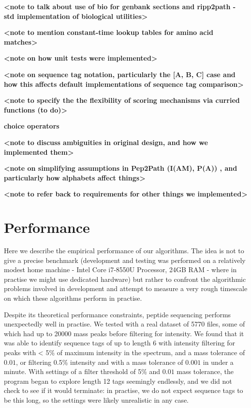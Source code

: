\documentclass{l4proj}
\begin{document}
\textbf{<note to talk about use of bio for genbank sections and ripp2path - std implementation of biological utilities>}

\textbf{<note to mention constant-time lookup tables for amino acid matches>}

\textbf{<note on how unit tests were implemented>}

\textbf{<note on sequence tag notation, particularly the [A, B, C] case and how this affects default implementations of sequence tag comparison>}

\textbf{<note to specify the the flexibility of scoring mechanisms via curried functions (to do)>}

\textbf{choice operators}

\textbf{<note to discuss ambiguities in original design, and how we implemented them>}

\textbf{<note on simplifying assumptions in Pep2Path (I(AM), P(A)) , and particularly how alphabets affect things>}

\textbf{<note to refer back to requirements for other things we implemented>}

\section{Performance}

Here we describe the empirical performance of our algorithms. The idea is not to give a precise benchmark (development and testing was performed on a relatively modest home machine - Intel Core i7-8550U Processor, 24GB RAM - where in practise we might use dedicated hardware) but rather to confront the algorithmic problems involved in development and attempt to measure a very rough timescale on which these algorithms perform in practise.

Despite its theoretical performance constraints, peptide sequencing performs unexpectedly well in practise. We tested with a real dataset of 5770 files, some of which had up to 20000 mass peaks before filtering for intensity. We found that it was able to identify sequence tags of up to length 6 with intensity filtering for peaks with < 5\% of maximum intensity in the spectrum, and a mass tolerance of \(0.01\), or filtering 0.5\% intensity and with a mass tolerance of \(0.001\) in under a minute. With settings of a filter threshold of 5\% and \(0.01\) mass tolerance, the program began to explore length 12 tags seemingly endlessly, and we did not check to see if it would terminate: in practise, we do not expect sequence tags to be this long, so the settings were likely unrealistic in any case. 
\end{document}

